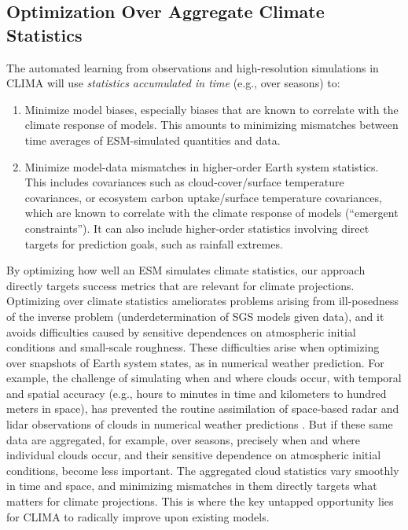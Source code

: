 \documentclass{article}
\begin{document}
\subsection{Optimization Over Aggregate Climate Statistics}

The automated learning from observations and high-resolution simulations in CLIMA will use \emph{statistics accumulated in time} (e.g., over seasons) to:
\begin{enumerate}
\item Minimize model biases, especially biases that are known to correlate with the climate response of models. This amounts to minimizing mismatches between time averages of ESM-simulated quantities and data.
\item Minimize model-data mismatches in higher-order Earth system statistics. This includes covariances such as cloud-cover/surface temperature covariances, or ecosystem carbon uptake/surface temperature covariances, which are known to correlate with the climate response of models (``emergent constraints''). It can also include higher-order statistics involving direct targets for prediction goals, such as rainfall extremes. 
\end{enumerate}
By optimizing how well an ESM simulates climate statistics, our approach directly targets success metrics that are relevant for climate projections. Optimizing over climate statistics ameliorates problems arising from ill-posedness of the inverse problem (underdetermination of SGS models given data), and it  avoids difficulties caused by sensitive dependences on atmospheric initial conditions and small-scale roughness. These difficulties arise when optimizing over snapshots of Earth system states, as in numerical weather prediction. For example, the challenge of simulating when and where clouds occur, with temporal and spatial accuracy (e.g., hours to minutes in time and kilometers to hundred meters in space), has prevented the routine assimilation of space-based radar and lidar observations of clouds in numerical weather predictions \citep{Stephens18a}. But if these same data are aggregated, for example, over seasons, precisely when and where individual clouds occur, and their sensitive dependence on atmospheric initial conditions, become less important. The aggregated cloud statistics vary smoothly in time and space, and minimizing mismatches in them directly targets what matters for climate projections. This is where the key untapped opportunity lies for CLIMA to radically improve upon existing models.
\end{document}
